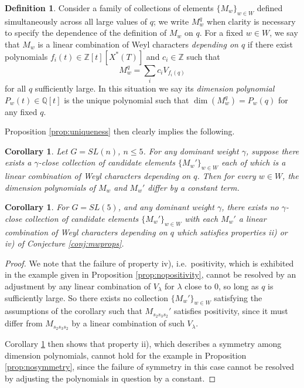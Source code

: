 \documentclass{amsart}
\newtheorem{corollary}[thm]{Corollary}
\theoremstyle{definition}
\newtheorem{defn}[thm]{Definition}
\begin{document}
\begin{defn}\label{def:qfamily}
    Consider a family of collections of elements $\{M_w\}_{w \in W}$ defined simultaneously across all large values of $q$; we write $M_w^q$ when clarity is necessary to specify the dependence of the definition of $M_w$ on $q$. For a fixed $w \in W$, we say that $M_w$ is a linear combination of Weyl characters \emph{depending on $q$} if there exist polynomials $f_i(t) \in \mathbb{Z}[t][X^*(T)]$ and $c_i \in \mathbb{Z}$ such that
    \[M_w^q = \sum_i c_iV_{f_i(q)}\]
    for all $q$ sufficiently large. In this situation we say its \emph{dimension polynomial} $P_w(t) \in \mathbb{Q}[t]$ is the unique polynomial such that $\dim(M_w^q) = P_w(q)$ for any fixed $q$.
\end{defn}

Proposition \ref{prop:uniqueness} then clearly implies the following. 
\begin{corollary}\label{cor:polysdiffer}
    Let $G = SL(n)$, $n \leq 5$. For any dominant weight $\gamma$, suppose there exists a $\gamma$-close collection of candidate elements $\{M_w'\}_{w \in W}$ each of which is a linear combination of Weyl characters depending on $q$. Then for every $w \in W$, the dimension polynomials of $M_w$ and $M_w'$ differ by a constant term.
\end{corollary}

\begin{corollary}\label{cor:cantdoit}
    For $G = SL(5)$, and any dominant weight $\gamma$, there exists no $\gamma$-close collection of candidate elements $\{M_w'\}_{w \in W}$ with each $M_w'$ a linear combination of Weyl characters depending on $q$ which satisfies properties ii) or iv) of Conjecture \ref{conj:mwprops}.
\end{corollary}
\begin{proof}
    We note that the failure of property iv), i.e.\ positivity, which is exhibited in the example given in Proposition \ref{prop:nopositivity}, cannot be resolved by an adjustment by any linear combination of $V_\lambda$ for $\lambda$ close to $0$, so long as $q$ is sufficiently large. So there exists no collection $\{M_w'\}_{w \in W}$ satisfying the assumptions of the corollary such that $M_{s_2s_3s_2}'$ satisfies positivity, since it must differ from $M_{s_2s_3s_2}$ by a linear combination of such $V_\lambda$.

    Corollary \ref{cor:cantdoit} then shows that property ii), which describes a symmetry among dimension polynomials, cannot hold for the example in Proposition \ref{prop:nosymmetry}, since the failure of symmetry in this case cannot be resolved by adjusting the polynomials in question by a constant.
\end{proof}
\end{document}
